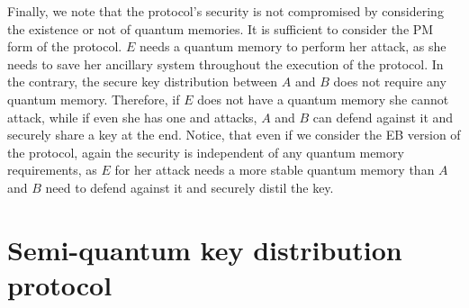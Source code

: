 Finally, we note that the protocol's security is not compromised by considering the existence or not of quantum memories. It is sufficient to consider the PM form of the protocol. $E$ needs a quantum memory to perform her attack, as she needs to save her ancillary system throughout the execution of the protocol. In the contrary, the secure key distribution between $A$ and $B$ does not require any quantum memory. Therefore, if $E$ does not have a quantum memory she cannot attack, while if even she has one and attacks, $A$ and $B$ can defend against it and securely share a key at the end. Notice, that even if we consider the EB version of the protocol, again the security is independent of any quantum memory requirements, as $E$ for her attack needs a more stable quantum memory than $A$ and $B$ need to defend against it and securely distil the key.  

\newpage

\section{Semi-quantum key distribution protocol}
\label{sec:semi-qkdscheme}

